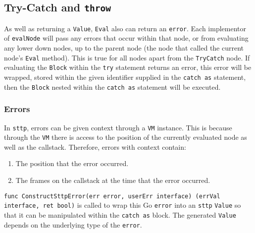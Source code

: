 \cprotect\subsection{Try-Catch and \verb|throw|}

As well as returning a \verb|Value|, \verb|Eval| also can return an \texttt{error}. Each implementor of \verb|evalNode| will pass any errors that occur within that node, or from evaluating any lower down nodes, up to the parent node (the node that called the current node's \verb|Eval| method). This is true for all nodes apart from the \verb|TryCatch| node. If evaluating the \verb|Block| within the \verb|try| statement returns an error, this error will be wrapped, stored within the given identifier supplied in the \verb|catch as| statement, then the \verb|Block| nested within the \verb|catch as| statement will be executed.

\subsubsection{Errors}

\label{sec:development-try-catch-throw-errors-context}
\begin{definition}
    In \verb|sttp|, errors can be given context through a \verb|VM| instance. This is because through the \verb|VM| there is access to the position of the currently evaluated node as well as the callstack. Therefore, errors with context contain:
    \begin{enumerate}
        \item The position that the error occurred.
        \item The frames on the callstack at the time that the error occurred.
    \end{enumerate}
\end{definition}

\texttt{func ConstructSttpError(err error, userErr interface{}) (errVal interface{}, ret bool)} is called to wrap this Go \texttt{error} into an \verb|sttp| \verb|Value| so that it can be manipulated within the \verb|catch as| block. The generated \verb|Value| depends on the underlying type of the \texttt{error}.

